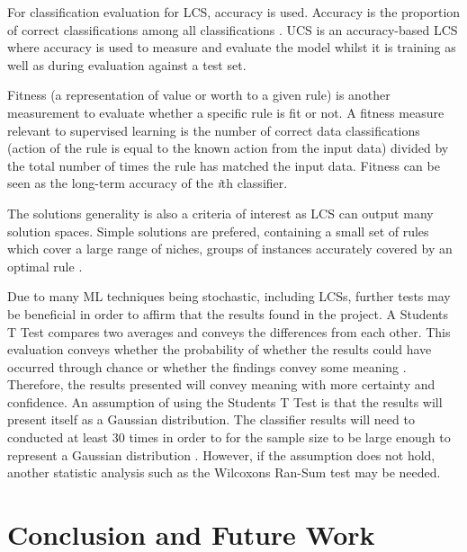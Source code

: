 For classification evaluation for LCS, accuracy is used. Accuracy is the proportion of correct classifications among all classifications \cite{urbanowicz2017introduction}. UCS is an accuracy-based LCS where accuracy is used to measure and evaluate the model whilst it is training as well as during evaluation against a test set.

Fitness (a representation of value or worth to a given rule)\cite{urbanowicz2017introduction} is another measurement to evaluate whether a specific rule is fit or not. A fitness measure relevant to supervised learning is the number of correct data classifications (action of the rule is equal to the known action from the input data) divided by the total number of times the rule has matched the input data. Fitness can be seen as the long-term accuracy of the \textit{i}th classifier.

The solution\textquotesingle s generality is also a criteria of interest as LCS can output many solution spaces. Simple solutions are prefered, containing a small set of rules which cover a large range of niches, groups of instances accurately covered by an optimal rule \cite{urbanowicz2017introduction}. 

Due to many ML techniques being stochastic, including LCSs, further tests may be beneficial in order to affirm that the results found in the project. A Student\textquotesingle s T Test compares two averages and conveys the differences from each other. This evaluation conveys whether the probability of whether the results could have occurred through chance or whether the findings convey some meaning \cite{blair1980comparison}. Therefore, the results presented will convey meaning with more certainty and confidence. An assumption of using the Student\textquotesingle s T Test is that the results will present itself as a Gaussian distribution. The classifier results will need to conducted at least 30 times in order to for the sample size to be large enough to represent a Gaussian distribution \cite{blair1980comparison}. However, if the assumption does not hold, another statistic analysis such as the Wilcoxon\textquotesingle s Ran-Sum test \cite{wilcoxon1950some} may be needed.


\chapter{Conclusion and Future Work}


